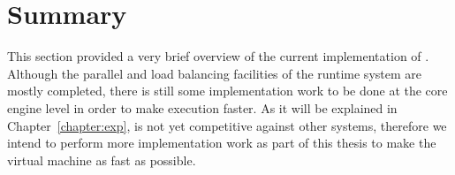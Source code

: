 \section{Summary}

This section provided a very brief overview of the current implementation of \lang. Although the parallel
and load balancing facilities of the runtime system are mostly completed, there is still some
implementation work to be done at the core engine level in order to make execution faster.
As it will be explained in Chapter~\ref{chapter:exp}, \lang is not yet competitive against
other systems, therefore we intend to perform more implementation work as part of this
thesis to make the virtual machine as fast as possible.
